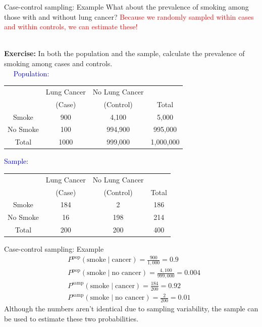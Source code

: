 \documentclass[10pt,t]{beamer}
\begin{document}
\begin{frame}{Case-control sampling: Example}
	\vspace{-1cm}
	What about the prevalence of smoking among those with and without lung cancer? \textcolor{red}{Because we randomly sampled within cases and within controls, we can estimate these!}
	\\ ~\
	
	\textbf{Exercise:} In both the population and the sample, calculate the prevalence of smoking among cases and controls.
	\\ ~\
	\vspace{-0.2cm}
	\textcolor{blue}{Population:} 
		\begin{center}
		\begin{table}
			\begin{tabular}{|c|cc|c|}
				\hline 
				& Lung Cancer & No Lung Cancer &  \\ 
				& (Case) & (Control) & Total  \\
				\hline 
				Smoke & 900 & 4,100  & 5,000 \\ 
				No Smoke & 100 & 994,900 & 995,000  \\ 
				\hline 
				Total & 1000 & 999,000 & 1,000,000 \\ 
				\hline 
			\end{tabular}
		\end{table}
	\end{center}
 \textcolor{blue}{Sample}:
	\begin{center}
		\begin{table}
			\begin{tabular}{|c|cc|c|}
				\hline 
				& Lung Cancer & No Lung Cancer &  \\ 
				& (Case) & (Control) & Total  \\
				\hline 
				Smoke & 184 & 2  & 186 \\ 
				No Smoke & 16 & 198 & 214  \\ 
				\hline 
				Total & 200 & 200 & 400 \\ 
				\hline 
			\end{tabular}
		\end{table}
	\end{center}
\end{frame}

\begin{frame}{Case-control sampling: Example}
	\begin{align*}
		&P^{\text{pop}}(\text{smoke} \mid \text{cancer}) = \frac{900}{1,000} = 0.9\\
		&P^{\text{pop}}(\text{smoke} \mid \text{no cancer}) = \frac{4,100}{999,000} = 0.004\\
		&P^{\text{samp}}(\text{smoke} \mid \text{cancer}) = \frac{184}{200} = 0.92\\
		&P^{\text{samp}}(\text{smoke} \mid \text{no cancer}) = \frac{2}{200} = 0.01
	\end{align*}
	Although the numbers aren't identical due to sampling variability, the sample can be used to estimate these two probabilities. 
\end{frame}
\end{document}
